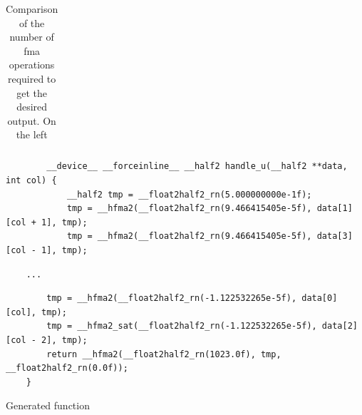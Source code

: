 \begin{table}[H]
\begin{minipage}[b]{.5\linewidth}
{\begin{tabular}{|l|c| c|}
                \hline
            \end{tabular}}
    \end{minipage}
    \begin{minipage}[b]{.5\linewidth}
    \end{minipage}
    \caption{Comparison of the number of \gls{fma} operations required to get the desired output. On the left }
\end{table}



\begin{listing}[H]
    \begin{verbatim}
        __device__ __forceinline__ __half2 handle_u(__half2 **data, int col) {
            __half2 tmp = __float2half2_rn(5.000000000e-1f);
            tmp = __hfma2(__float2half2_rn(9.466415405e-5f), data[1][col + 1], tmp);
            tmp = __hfma2(__float2half2_rn(9.466415405e-5f), data[3][col - 1], tmp);
        \end{verbatim}
    \vspace{-26pt}
    \begin{verbatim}
    ...
    \end{verbatim}
    \vspace{-26pt}
    \begin{verbatim}
        tmp = __hfma2(__float2half2_rn(-1.122532265e-5f), data[0][col], tmp);
        tmp = __hfma2_sat(__float2half2_rn(-1.122532265e-5f), data[2][col - 2], tmp);
        return __hfma2(__float2half2_rn(1023.0f), tmp, __float2half2_rn(0.0f));
    }
    \end{verbatim}
    \caption{Generated function}
    \label{listing:generated_function}
\end{listing}